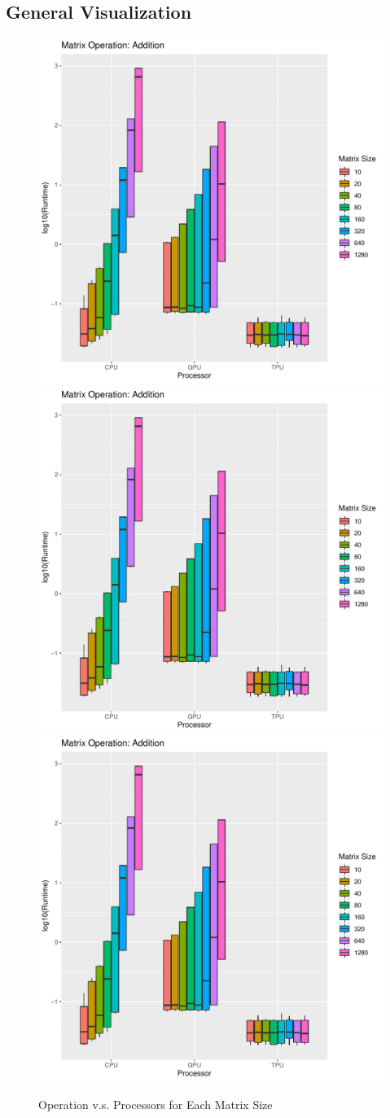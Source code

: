 \documentclass[
]{article}
\begin{document}
\hypertarget{general-visualization}{%
\subsection{General Visualization}\label{general-visualization}}

\begin{figure}
\includegraphics[page=1,width=0.5\linewidth]{../figs/operations_plots.pdf}
\includegraphics[page=2,width=0.5\linewidth]{../figs/operations_plots.pdf}
\includegraphics[page=3,width=0.5\linewidth]{../figs/operations_plots.pdf}
\caption{\label{fig:operation} Operation v.s. Processors for Each Matrix Size}
\end{figure}
\end{document}
